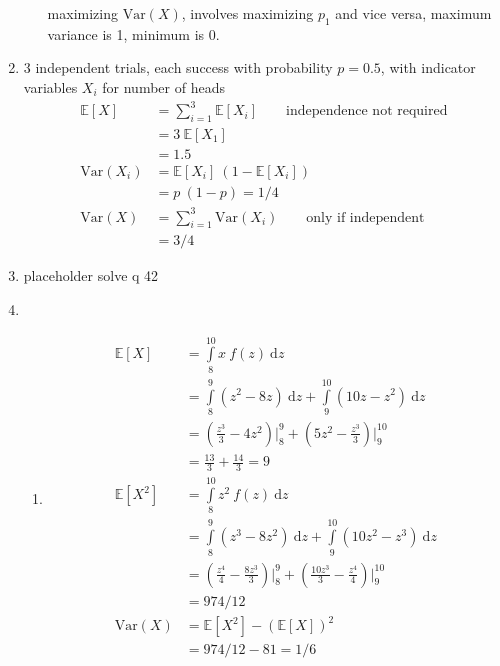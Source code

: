 \begin{enumerate}
\begin{enumerate}
			maximizing $ \mathrm{Var}(X) $, involves maximizing $ p_1 $ and vice versa,
			maximum variance is 1, minimum is 0.
			
		\end{enumerate}
	
	
	\item $ 3 $ independent trials, each success with probability $ p = 0.5 $, with indicator variables $ X_i $ for number of heads \\
	
		\begin{align}
			\mathbb{E}[X] &= \sum\limits_{i = 1}^{3} \mathbb{E}[X_i] \qquad \text{independence not required} \nonumber \\
			&= 3\ \mathbb{E}[X_1] \nonumber \\
			&= 1.5   \\
			\mathrm{Var}(X_i) &= \mathbb{E}[X_i]\ (1 - \mathbb{E}[X_i]) \nonumber \\
			&= p\ (1 - p) = 1/4 \nonumber \\
			\mathrm{Var}(X) &= \sum\limits_{i = 1}^{3} \mathrm{Var}(X_i) \qquad \text{only if independent} \nonumber \\
			&= 3/4
		\end{align}
	
	
	\item placeholder solve q 42 \\
	
	\item 
		\begin{enumerate}
			
			\item \begin{align}
				\mathbb{E}[X] &= \int\limits_{8}^{10} x\ f(z)\ \mathrm{d}z \nonumber \\
				&= \int\limits_{8}^{9} (z^2-8z)\ \mathrm{d}z  + \int\limits_{9}^{10} (10z-z^2)\ \mathrm{d}z\nonumber \\
				&= \left(\frac{z^3}{3} - 4z^2\right) \Big|_8^9  + \left(5z^2 - \frac{z^3}{3}\right) \Big|_9^{10} \\
				&= \frac{13}{3} + \frac{14}{3} = 9 \\
				\mathbb{E}[X^2] &= \int\limits_{8}^{10} z^2\ f(z)\ \mathrm{d}z \nonumber \\
				&= \int\limits_{8}^{9} (z^3-8z^2)\ \mathrm{d}z  + \int\limits_{9}^{10} (10z^2-z^3)\ \mathrm{d}z\nonumber \\
				&= \left(\frac{z^4}{4} - \frac{8z^3}{3}\right) \Big|_8^9  + \left(\frac{10z^3}{3} - \frac{z^4}{4}\right) \Big|_9^{10} \\
				&= 974/12 \\
				\mathrm{Var}(X) &= \mathbb{E}[X^2]- (\mathbb{E}[X])^2 \nonumber \\
				&= 974/12 - 81 = 1/6 \\
			\end{align}
			

\end{enumerate}
\end{enumerate}
